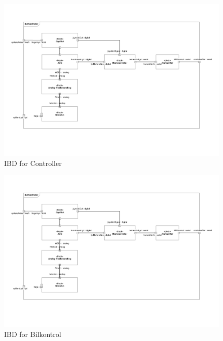 \begin{figure}
	\centering
   	\includegraphics[page=1,width=1\linewidth]{figs/Diagrammer/IBD_SumoBot_BilKontrol_Controller.pdf}
	\caption{IBD for Controller}
	\label{fig:IBD_Controller}
\end{figure}
\begin{figure}
	\centering
   	\includegraphics[page=2,width=1\linewidth]{figs/Diagrammer/IBD_SumoBot_BilKontrol_Controller.pdf}
	\caption{IBD for Bilkontrol}
	\label{fig:IBD_Bilkontrol}
\end{figure}
